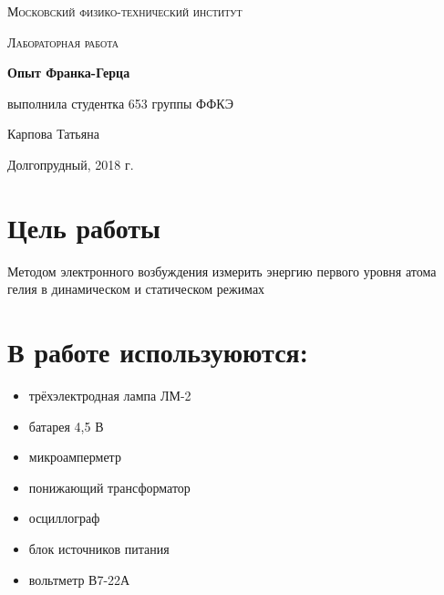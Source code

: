 \documentclass[a4paper]{article}
\begin{document}
\begin{titlepage}
	\centering
	\vspace{5cm}
	{\scshape\LARGE Московский физико-технический институт \par}
	\vspace{4cm}
	{\scshape\Large Лабораторная работа \par}
	\vspace{1cm}
	{\huge\bfseries Опыт Франка-Герца \par}
	\vspace{1cm}
	\vfill
\begin{flushright}
	{\large выполнила студентка 653 группы ФФКЭ}\par
	\vspace{0.3cm}
	{\LARGE Карпова Татьяна} \par

\end{flushright}
	

	\vfill

	Долгопрудный, 2018 г.
\end{titlepage}

\section{Цель работы}
Методом электронного возбуждения измерить энергию первого уровня атома гелия в динамическом и статическом режимах

\section{В работе используюются:}
\begin{itemize}
    \item трёхэлектродная лампа ЛМ-2
    \item батарея 4,5 В
    \item микроамперметр
    \item понижающий трансформатор
    \item осциллограф
    \item блок источников питания
    \item вольтметр В7-22А
\end{itemize}
\end{document}

